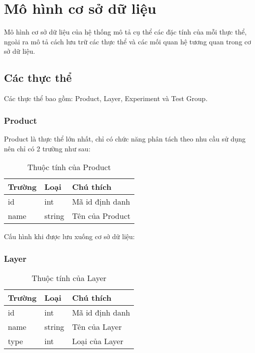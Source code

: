 \section{Mô hình cơ sở dữ liệu}

Mô hình cơ sở dữ liệu của hệ thống mô tả cụ thể các đặc tính của mỗi thực thể, ngoài ra mô tả
cách lưu trữ các thực thể và các mối quan hệ tương quan trong cơ sở dữ liệu.

\subsection{Các thực thể}

Các thực thể bao gồm: Product, Layer, Experiment và Test Group.

\subsubsection{Product}

Product là thực thể lớn nhất, chỉ có chức năng phân tách theo nhu cầu sử dụng nên chỉ có 2 trường như sau:
\begin{table}[H]
	\centering
	\begin{tabular}{|l|l|l|}
		\hline
		Trường & Loại   & Chú thích       \\ \hline
		id     & int    & Mã id định danh       \\ \hline
		name   & string & Tên của Product \\ \hline
	\end{tabular}
	\caption{Thuộc tính của Product}
\end{table}

Cấu hình khi được lưu xuống cơ sở dữ liệu:

\begin{itemize}
\end{itemize}

\subsubsection{Layer}

\begin{table}[H]
	\centering
	\begin{tabular}{|l|l|l|}
		\hline
		Trường & Loại   & Chú thích      \\ \hline
		id     & int    & Mã id định danh      \\ \hline
		name   & string & Tên của Layer  \\ \hline
		type   & int    & Loại của Layer \\ \hline
	\end{tabular}
	\caption{Thuộc tính của Layer}
\end{table}

